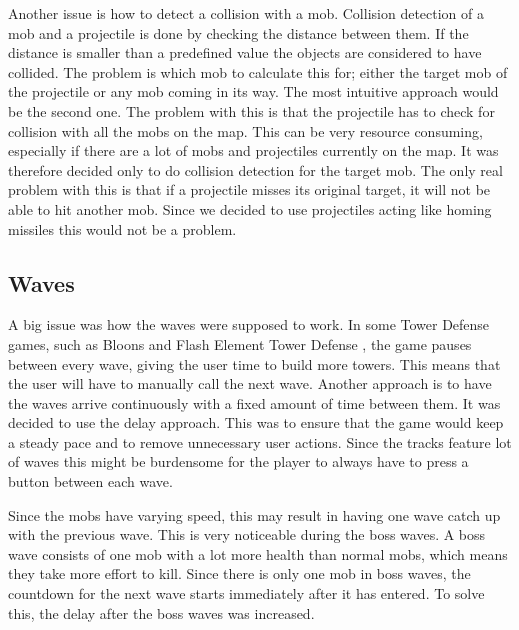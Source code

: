 Another issue is how to detect a collision with a mob. Collision detection of a mob and a projectile is done by checking the distance between them. If the distance is smaller than a predefined value the objects are considered to have collided. The problem is which mob to calculate this for; either the target mob of the projectile or any mob coming in its way. The most intuitive approach would be the second one. The problem with this is that the projectile has to check for collision with all the mobs on the map. This can be very resource consuming, especially if there are a lot of mobs and projectiles currently on the map. It was therefore decided only to do collision detection for the target mob. The only real problem with this is that if a projectile misses its original target, it will not be able to hit another mob. Since we decided to use projectiles acting like homing missiles this would not be a problem.
\subsection{Waves}

A big issue was how the waves were supposed to work. In some Tower Defense games, such as Bloons \citep{bloons} and Flash Element Tower Defense \citep{elementTD}, the game pauses between every wave, giving the user time to build more towers. This means that the user will have to manually call the next wave. Another approach is to have the waves arrive continuously with a fixed amount of time between them. It was decided to use the delay approach. This was to ensure that the game would keep a steady pace and to remove unnecessary user actions. Since the tracks feature lot of waves this might be burdensome for the player to always have to press a button between each wave.

Since the mobs have varying speed, this may result in having one wave catch up with the previous wave. This is very noticeable during the boss waves. A boss wave consists of one mob with a lot more health than normal mobs, which means they take more effort to kill. Since there is only one mob in boss waves, the countdown for the next wave starts immediately after it has entered. To solve this, the delay after the boss waves was increased. 
